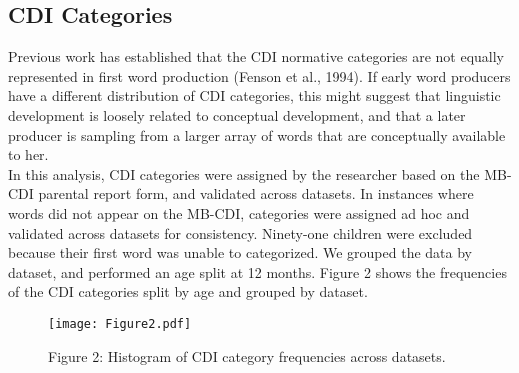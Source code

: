 \documentclass[10pt,letterpaper]{article}
\begin{document}
\subsection{CDI Categories} 
Previous work has established that the CDI normative categories are not equally represented in first word production (Fenson et al., 1994). If early word producers have a different distribution of CDI categories, this might suggest that linguistic development is loosely related to conceptual development, and that a later producer is sampling from a larger array of words that are conceptually available to her.\\
In this analysis, CDI categories were assigned by the researcher based on the MB-CDI parental report form, and validated across datasets. In instances where words did not appear on the MB-CDI,  categories were assigned ad hoc and validated across datasets for consistency. Ninety-one children were excluded because their first word was unable to categorized. We grouped the data by dataset, and performed an age split at 12 months. Figure 2 shows the frequencies of the CDI categories split by age and grouped by dataset.

\begin{figure}[t]
\begin{center}
\texttt{[image: Figure2.pdf]}
\end{center}
\caption{Figure 2: Histogram of CDI category frequencies across datasets.}
\end{figure}
\end{document}
